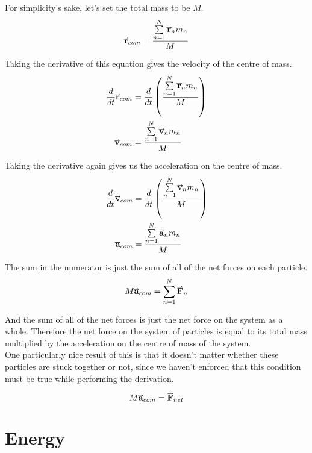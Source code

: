 \documentclass[main.tex]{subfiles}
\begin{document}
                For simplicity's sake, let's set the total mass to be $M$.
                \begin{equation*}
                    \vect{r}_{com} = \frac{\sum\limits_{n=1}^N \vect{r}_n m_n}{M}
                \end{equation*}

                Taking the derivative of this equation gives the velocity of the centre of mass.
                \begin{align*}
                    \frac{d}{dt} \vect{r}_{com} &= \frac{d}{dt} \left(\frac{\sum\limits_{n=1}^N \vect{r}_n m_n}{M} \right)\\
                    \vect{v}_{com} &= \frac{\sum\limits_{n=1}^N \vect{v}_n m_n}{M}
                \end{align*}

                Taking the derivative again gives us the acceleration on the centre of mass.
                \begin{align*}
                    \frac{d}{dt} \vect{v}_{com} &= \frac{d}{dt} \left(\frac{\sum\limits_{n=1}^N \vect{v}_n m_n}{M} \right)\\
                    \vect{a}_{com} &= \frac{\sum\limits_{n=1}^N \vect{a}_n m_n}{M}
                \end{align*}

                The sum in the numerator is just the sum of all of the net forces on each particle.
                \begin{equation*}
                    M\vect{a}_{com} = \sum\limits_{n=1}^N \vect{F}_n
                \end{equation*}

                And the sum of all of the net forces is just the net force on the system as a whole. Therefore the net force on the system of particles is equal to its total mass multiplied by the acceleration on the centre of mass of the system.\\
                One particularly nice result of this is that it doesn't matter whether these particles are stuck together or not, since we haven't enforced that this condition must be true while performing the derivation.

                \begin{equation*}
                    M\vect{a}_{com} = \vect{F}_{net}
                \end{equation*}

            
            \section{Energy}
                \label{sec: Energy}
\end{document}
